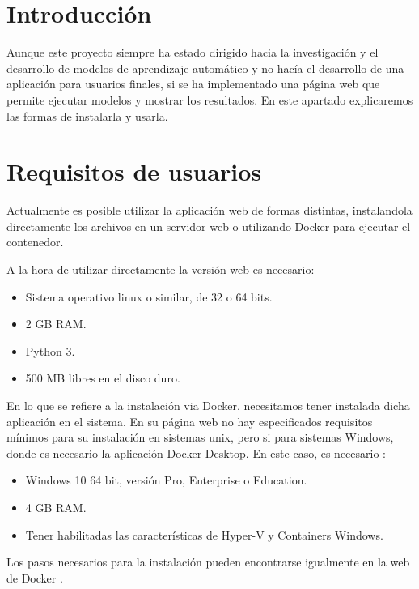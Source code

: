
\section{Introducción}

Aunque este proyecto siempre ha estado dirigido hacia la investigación y el desarrollo de modelos de aprendizaje automático y no hacía el desarrollo de una aplicación para usuarios finales, si se ha implementado una página web que permite ejecutar modelos y mostrar los resultados. En este apartado explicaremos las formas de instalarla y usarla.

\section{Requisitos de usuarios}

Actualmente es posible utilizar la aplicación web de formas distintas, instalandola directamente los archivos en un servidor web o utilizando Docker para ejecutar el contenedor.

A la hora de utilizar directamente la versión web es necesario:

\begin{itemize}
    \item Sistema operativo linux o similar, de 32 o 64 bits.
    \item 2 GB RAM.
    \item Python 3.
    \item 500 MB libres en el disco duro.
\end{itemize}

En lo que se refiere a la instalación via Docker, necesitamos tener instalada dicha aplicación en el sistema. En su página web no hay especificados requisitos mínimos para su instalación en sistemas unix, pero si para sistemas Windows, donde es necesario la aplicación Docker Desktop. En este caso, es necesario \cite{Docker-instalacion}:

\begin{itemize}
    \item Windows 10 64 bit, versión Pro, Enterprise o Education.
    \item 4 GB RAM.
    \item Tener habilitadas las características de Hyper-V y Containers Windows.
\end{itemize}

Los pasos necesarios para la instalación pueden encontrarse igualmente en la web de Docker \cite{Docker-instalacion}.

